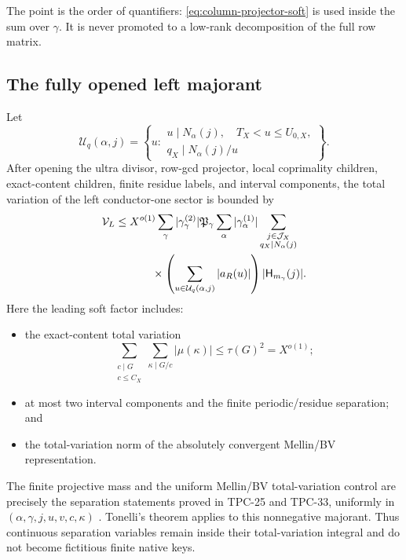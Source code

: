 The point is the order of quantifiers: \eqref{eq:column-projector-soft}
is used inside the sum over \(\gamma\).  It is never promoted to a
low-rank decomposition of the full row matrix.

\subsection{The fully opened left majorant}

Let
\[
 \mathcal U_q(\alpha,j)
 =
 \left\{
 u:
 \begin{array}{c}
 u\mid N_\alpha(j),\quad T_X<u\le U_{0,X},\\
 q_X\mid N_\alpha(j)/u
 \end{array}
 \right\}.
\]
After opening the ultra divisor, row-gcd projector, local
coprimality children, exact-content children, finite residue labels,
and interval components, the total variation of the left
conductor-one sector is bounded by
\begin{align}
 \mathcal V_L
 \le{}&
 X^{o(1)}
 \sum_\gamma|\gamma_\gamma^{(2)}|
 \mathfrak P_\gamma
 \sum_\alpha|\gamma_\alpha^{(1)}|
 \sum_{\substack{j\in\mathcal J_X\\
                 q_X\mid N_\alpha(j)}}
 \notag\\
 &\qquad\times
 \left(
 \sum_{u\in\mathcal U_q(\alpha,j)}
 |a_R(u)|
 \right)
 |\mathsf H_{m_\gamma}(j)|.
\label{eq:fully-opened-left-majorant}
\end{align}
Here the leading soft factor includes:
\begin{itemize}[leftmargin=2em]
\item the exact-content total variation
  \[
  \sum_{\substack{c\mid G\\c\le C_X}}
  \sum_{\kappa\mid G/c}|\mu(\kappa)|
  \le\tau(G)^2=X^{o(1)};
  \]
\item at most two interval components and the finite periodic/residue
  separation; and
\item the total-variation norm of the absolutely convergent
  Mellin/BV representation.
\end{itemize}
The finite projective mass and the uniform Mellin/BV
total-variation control are precisely the separation statements
proved in TPC-25 and TPC-33, uniformly in
\((\alpha,\gamma,j,u,v,c,\kappa)\)
\citep{WangTPC25,WangTPC33,WangTPC93}.
Tonelli's theorem applies to this nonnegative majorant.  Thus
continuous separation variables remain inside their total-variation
integral and do not become fictitious finite native keys.

